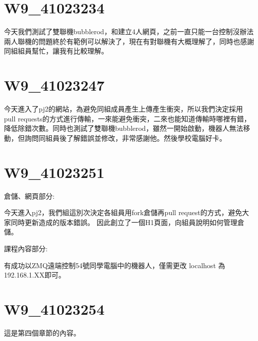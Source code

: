\documentclass{article}
\begin{document}
\section{W9\_41023234}

今天我們測試了雙聯機bubblerod，和建立4人網頁，之前一直只能一台控制沒辦法兩人聯機的問題終於有範例可以解決了，現在有對聯機有大概理解了，同時也感謝同組組員幫忙，讓我有比較理解。

\section{W9\_41023247}

今天進入了pj2的網站，為避免同組成員產生上傳產生衝突，所以我們決定採用pull requests的方式進行傳輸，一來能避免衝突，二來也能知道傳輸時哪裡有錯，降低除錯次數。同時也測試了雙聯機bubblerod，雖然一開始啟動，機器人無法移動，但詢問同組員後了解錯誤並修改，非常感謝他。然後學校電腦好卡。

\section{W9\_41023251}

倉儲、網頁部分:

今天進入pj2，我們組這別次決定各組員用fork倉儲再pull request的方式，避免大家同時更新造成的版本錯誤。
因此創立了一個H1頁面，向組員說明如何管理倉儲。


課程內容部分:

有成功以ZMQ遠端控制54號同學電腦中的機器人，僅需更改 localhost 為192.168.1.XX即可。

\section{W9\_41023254}

這是第四個章節的內容。
\end{document}
